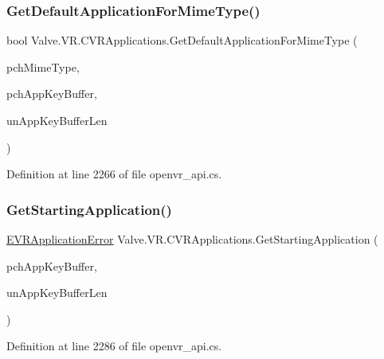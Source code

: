 \subsubsection{\texorpdfstring{GetDefaultApplicationForMimeType()}{GetDefaultApplicationForMimeType()}}
{\footnotesize\ttfamily bool Valve.\+V\+R.\+C\+V\+R\+Applications.\+Get\+Default\+Application\+For\+Mime\+Type (\begin{DoxyParamCaption}\item[{string}]{pch\+Mime\+Type,  }\item[{System.\+Text.\+String\+Builder}]{pch\+App\+Key\+Buffer,  }\item[{uint}]{un\+App\+Key\+Buffer\+Len }\end{DoxyParamCaption})}



Definition at line 2266 of file openvr\+\_\+api.\+cs.

\mbox{\label{class_valve_1_1_v_r_1_1_c_v_r_applications_aa29b29431a7d099a1c81dfdf8b3be280}} 
\subsubsection{\texorpdfstring{GetStartingApplication()}{GetStartingApplication()}}
{\footnotesize\ttfamily \mbox{\hyperlink{namespace_valve_1_1_v_r_a3488adab8a219b579fcee50f4e63a8b6}{E\+V\+R\+Application\+Error}} Valve.\+V\+R.\+C\+V\+R\+Applications.\+Get\+Starting\+Application (\begin{DoxyParamCaption}\item[{System.\+Text.\+String\+Builder}]{pch\+App\+Key\+Buffer,  }\item[{uint}]{un\+App\+Key\+Buffer\+Len }\end{DoxyParamCaption})}



Definition at line 2286 of file openvr\+\_\+api.\+cs.

\mbox{\label{class_valve_1_1_v_r_1_1_c_v_r_applications_a0505122273189cf3ec0dd27a800f9e8c}} 
